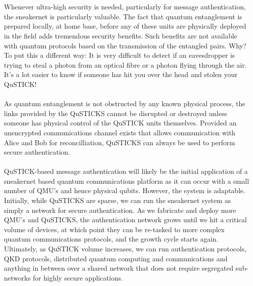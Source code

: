 \documentclass[aps,prl,twocolumn,10pt,nofootinbib]{revtex4}
\begin{document}
\\
\\
Whenever ultra-high security is needed, particularly for message authentication, the sneakernet is particularly valuable.  The fact that quantum entanglement is prepared locally, at home base, before any of these units are physically deployed in the field adds tremendous security benefits.  Such benefits are not available with quantum protocols based on the transmission of the entangled pairs.  Why? To put this a different way:  It is very difficult to detect if an eavesdropper is trying to steal a photon from an optical fibre or a photon flying through the air. It's a lot easier to know if someone has hit you over the head and stolen your QuSTICK!
\\
\\
As quantum entanglement is not obstructed by any known physical process, the links provided by the QuSTICKS cannot be disrupted or destroyed unless someone has physical control of the QuSTICK units themselves.  Provided an unencrypted communications channel exists that allows communication with Alice and Bob for reconcilliation, QuSTICKS can always be used to perform secure authentication.  
\\
\\
QuSTICK-based message authentication will likely be the initial application of a sneakernet based quantum communications platform as it can occur with a small number of QMU's and hence physical qubits.  However, the system is adaptable.  Initially, while QuSTICKS are sparse, we can run the sneakernet system as simply a network for secure authentication.  As we fabricate and deploy more QMU's and QuSTICKS, the authentication network grows until we hit a critical volume of devices, at which point they can be re-tasked to more complex quantum communications protocols, and the growth cycle starts again.  Ultimately, as QuSTICK volume increases, we can run authentication protocols, QKD protocols, distributed quantum computing and communications and anything in between over a shared network that does not require segregated sub-networks for highly secure applications. 
\end{document}
